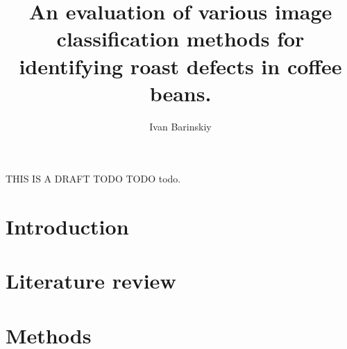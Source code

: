 \documentclass{./template/UoYCSproject}
\author{Ivan Barinskiy}
\title{An evaluation of various image classification methods for identifying
roast defects in coffee beans.}
\begin{document}
	\maketitle
	\listoffigures \listoftables

	\begin{summary}
		THIS IS A DRAFT TODO TODO todo.
	\end{summary}

	\chapter{Introduction}
	\label{ch:introduction}
	

	\chapter{Literature review}
	\label{ch:litreview}
	

	\chapter{Methods}
	\label{ch:methods}
	

	\printbibliography
\end{document}
